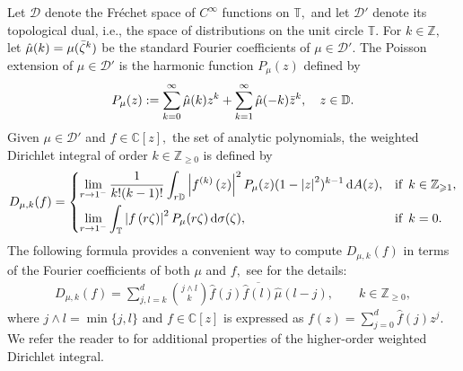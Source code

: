 \documentclass[10pt,oneside,reqno]{amsart}
\theoremstyle{definition}
\theoremstyle{remark}
\newcommand{\abs}[1]{\left\lvert #1 \right\rvert}
\newcommand{\D}{\mathbb D}
\newcommand{\T}{\mathbb T}
\numberwithin{equation}{section}
\begin{document}
Let $\mathcal D$ denote the Fr\'{e}chet space of $C^{\infty}$ functions on $\T,$ and let $\mathcal D'$ denote its topological dual, i.e., the space of distributions on the unit circle $\mathbb T.$  For $k\in\mathbb Z,$ let $\hat{\mu}(k)= \mu (\Bar{\zeta}^k)$ be the standard Fourier coefficients of $\mu\in \mathcal D'.$ The Poisson extension of $\mu\in \mathcal D'$ is the harmonic function $P_{\mu}(z)$ defined by
 \begin{align*}
    P_{\mu}(z):= \sum\limits_{k=0}^{\infty} \hat{\mu}(k)z^k + \sum\limits_{k=1}^{\infty} \hat{\mu}(-k)\Bar{z}^k,\quad z\in\mathbb D.
 \end{align*}
 Given $\mu\in \mathcal D'$ and $f\in \mathbb C[z],$ the set of analytic polynomials, the weighted Dirichlet integral of order $k\in \mathbb Z_{\geqslant 0}$ is defined by
 \begin{align*}
    D_{\mu,k}(f)= 
    \begin{dcases}
         \lim_{r\to 1^{-}}\frac{1}{k! (k-1)!} \int_{r\D}  \abs{f^{\left( k \right)}\left( z\right) }^2 P_{\mu}(z) (1-\abs{z}^2)^{k-1} \, \mathrm{d}A(z), & \mbox{if\,\,\,} k\in\mathbb Z_{\geqslant 1},\\
         \lim_{r\to 1^{-}} \int_{\T}  \abs{f\left( r\zeta\right) }^2 P_{\mu}(r\zeta) \, \mathrm{d}\sigma(\zeta), & \mbox{if\,\,\,} k=0.
     \end{dcases}
 \end{align*}
The following formula provides a convenient way to compute $D_{\mu,k}(f)$ in terms of the Fourier coefficients of both $\mu$ and $f,$ see \cite[Lemma 3.2]{Rydhe19} for the details:
\begin{align}\label{Formula for semi norm}
   D_{\mu,k}(f)= \sum\limits_{j,l=k}^{d}\binom{j\wedge l}{k} \hat{f}(j) \overline{\hat{f}(l)} \hat{\mu}(l-j), \qquad k \in \mathbb Z_{\geqslant 0},
\end{align}
where $j\wedge l= \min\{j,l\}$ and $f \in \mathbb C[z]$ is expressed as $f(z)= \sum_{j=0}^{d}\hat{f}(j) z^j.$  
We refer the reader to \cite{Rydhe19} for additional properties of the higher-order weighted Dirichlet integral.
\end{document}
